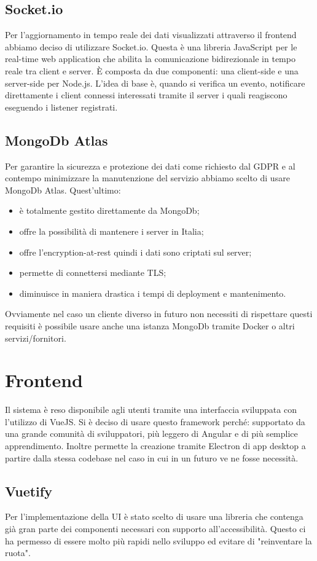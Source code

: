 \documentclass[italian]{report}
\begin{document}
\subsection{Socket.io}
Per l'aggiornamento in tempo reale dei dati visualizzati attraverso il frontend abbiamo deciso di utilizzare Socket.io. Questa è una libreria JavaScript per le real-time web application che abilita la comunicazione bidirezionale in tempo reale tra client e server. È composta da due componenti: una client-side e una server-side per Node.js. L’idea di base è, quando si verifica un evento, notificare direttamente i client connessi interessati tramite il server i quali reagiscono eseguendo i listener registrati.

\subsection{MongoDb Atlas}
Per garantire la sicurezza e protezione dei dati come richiesto dal GDPR e al contempo minimizzare la manutenzione del servizio abbiamo scelto di usare MongoDb Atlas. Quest'ultimo:
\begin{itemize}
    \item è totalmente gestito direttamente da MongoDb;
    \item offre la possibilità di mantenere i server in Italia;
    \item offre l'encryption-at-rest quindi i dati sono criptati sul server;
    \item permette di connettersi mediante TLS;
    \item diminuisce in maniera drastica i tempi di deployment e mantenimento.
\end{itemize}
Ovviamente nel caso un cliente diverso in futuro non necessiti di rispettare questi requisiti è possibile usare anche una istanza MongoDb tramite Docker o altri servizi/fornitori.

\section{Frontend}
Il sistema è reso disponibile agli utenti tramite una interfaccia sviluppata con l'utilizzo di VueJS. Si è deciso di usare questo framework perché: supportato da una grande comunità di sviluppatori, più leggero di Angular e di più semplice apprendimento. Inoltre permette la creazione tramite Electron di app desktop a partire dalla stessa codebase nel caso in cui in un futuro ve ne fosse necessità.

\subsection{Vuetify}
Per l'implementazione della UI è stato scelto di usare una libreria che contenga già gran parte dei componenti necessari con supporto all'accessibilità. Questo ci ha permesso di essere molto più rapidi nello sviluppo ed evitare di "reinventare la ruota".
\end{document}
